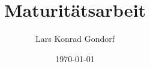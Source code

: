\documentclass[
  a4paper,
  11pt,
  oneside
]{article}
\begin{document}
\title{Maturitätsarbeit}
\author{Lars Konrad Gondorf}
\date{\today}
\maketitle


\end{document}
